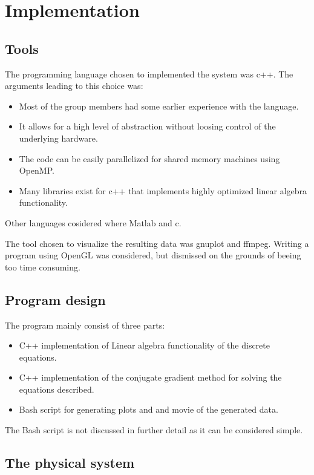 \chapter{Implementation}

\section{Tools}

The programming language chosen to implemented the system was c++.
The arguments leading to this choice was:

\begin{itemize}
\item Most of the group members had some earlier experience with the language.
\item It allows for a high level of abstraction without loosing control of the
underlying hardware.
\item The code can be easily parallelized for shared memory machines using OpenMP.
\item Many libraries exist for c++ that implements highly optimized linear algebra
functionality.
\end{itemize}

Other languages cosidered where Matlab and c.

The tool chosen to visualize the resulting data was gnuplot and ffmpeg. Writing a
program using OpenGL was considered, but dismissed on the grounds of beeing too time consuming.

\section{Program design}

The program mainly consist of three parts:

\begin{itemize}
\item C++ implementation of Linear algebra functionality of the discrete equations.
\item C++ implementation of the conjugate gradient method for solving the
equations described.
\item Bash script for generating plots and and movie of the generated data.
\end{itemize}

The Bash script is not discussed in further detail as it can be considered simple.

\section{The physical system}

